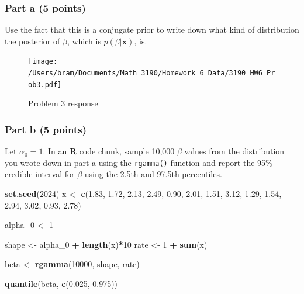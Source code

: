 \documentclass[
]{article}
\newenvironment{Shaded}{\begin{snugshade}}{\end{snugshade}}
\newcommand{\DecValTok}[1]{\textcolor[rgb]{0.00,0.00,0.81}{#1}}
\newcommand{\FloatTok}[1]{\textcolor[rgb]{0.00,0.00,0.81}{#1}}
\newcommand{\FunctionTok}[1]{\textcolor[rgb]{0.13,0.29,0.53}{\textbf{#1}}}
\newcommand{\NormalTok}[1]{#1}
\newcommand{\OtherTok}[1]{\textcolor[rgb]{0.56,0.35,0.01}{#1}}
\newcommand{\SpecialCharTok}[1]{\textcolor[rgb]{0.81,0.36,0.00}{\textbf{#1}}}
\begin{document}
\hypertarget{part-a-5-points-1}{%
\subsubsection{Part a (5 points)}\label{part-a-5-points-1}}

Use the fact that this is a conjugate prior to write down what kind of
distribution the posterior of \(\beta\), which is
\(p(\beta|\boldsymbol{x})\), is.

\begin{figure}
\centering
\texttt{[image: /Users/bram/Documents/Math\_3190/Homework\_6\_Data/3190\_HW6\_Prob3.pdf]}
\caption{Problem 3 response}
\end{figure}

\hypertarget{part-b-5-points-1}{%
\subsubsection{Part b (5 points)}\label{part-b-5-points-1}}

Let \(\alpha_0=1\). In an \textbf{R} code chunk, sample 10,000 \(\beta\)
values from the distribution you wrote down in part a using the
\texttt{rgamma()} function and report the 95\% credible interval for
\(\beta\) using the 2.5th and 97.5th percentiles.

\begin{Shaded}
\begin{Highlighting}[]
\FunctionTok{set.seed}\NormalTok{(}\DecValTok{2024}\NormalTok{)}
\NormalTok{x }\OtherTok{\textless{}{-}} \FunctionTok{c}\NormalTok{(}\FloatTok{1.83}\NormalTok{, }\FloatTok{1.72}\NormalTok{, }\FloatTok{2.13}\NormalTok{, }\FloatTok{2.49}\NormalTok{, }\FloatTok{0.90}\NormalTok{, }\FloatTok{2.01}\NormalTok{, }\FloatTok{1.51}\NormalTok{, }
       \FloatTok{3.12}\NormalTok{, }\FloatTok{1.29}\NormalTok{, }\FloatTok{1.54}\NormalTok{, }\FloatTok{2.94}\NormalTok{, }\FloatTok{3.02}\NormalTok{, }\FloatTok{0.93}\NormalTok{, }\FloatTok{2.78}\NormalTok{)}

\NormalTok{alpha\_0 }\OtherTok{\textless{}{-}} \DecValTok{1}

\NormalTok{shape }\OtherTok{\textless{}{-}}\NormalTok{ alpha\_0 }\SpecialCharTok{+} \FunctionTok{length}\NormalTok{(x)}\SpecialCharTok{*}\DecValTok{10}
\NormalTok{rate }\OtherTok{\textless{}{-}} \DecValTok{1} \SpecialCharTok{+} \FunctionTok{sum}\NormalTok{(x)}

\NormalTok{beta }\OtherTok{\textless{}{-}} \FunctionTok{rgamma}\NormalTok{(}\DecValTok{10000}\NormalTok{, shape, rate)}

\FunctionTok{quantile}\NormalTok{(beta, }\FunctionTok{c}\NormalTok{(}\FloatTok{0.025}\NormalTok{, }\FloatTok{0.975}\NormalTok{))}
\end{Highlighting}
\end{Shaded}
\end{document}

